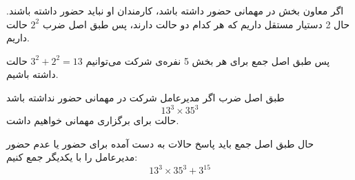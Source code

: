 \begin{enumerate}
\begin{itemize}
        \p
        \p
        
        اگر معاون بخش در مهمانی حضور داشته باشد، کارمندان او نباید حضور داشته باشند. حال 2 دستیار مستقل داریم که هر کدام دو حالت دارند، پس طبق اصل ضرب $2^2$ حالت داریم.

        \p
        \p
        
        پس طبق اصل جمع برای هر بخش 5 نفره‌ی شرکت می‌توانیم
        $ 3^2 + 2^2 = 13 $
        حالت داشته باشیم.
    \end{itemize}
    
    \p
    طبق اصل ضرب اگر مدیرعامل شرکت در مهمانی حضور نداشته باشد
    $$ 13^3 \times  35 ^ 3 $$
    حالت برای برگزاری مهمانی خواهیم داشت.
    
\end{enumerate}
    
\p
حال طبق اصل جمع باید پاسخ حالات به دست آمده برای حضور یا عدم حضور مدیرعامل را با یکدیگر جمع کنیم:   
$$13^3 \times  35 ^ 3  + 3^{15}$$
